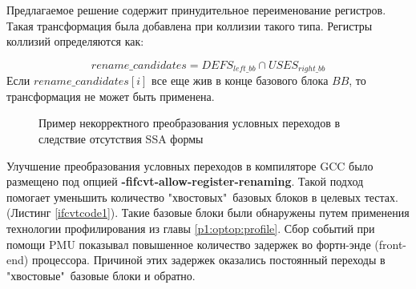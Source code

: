 Предлагаемое решение содержит принудительное переименование регистров. Такая трансформация была добавлена при коллизии такого типа. Регистры коллизий определяются как:

\begin{equation}
	rename\_candidates = DEFS_{left\_bb} \cap USES_{right\_bb} 
\end{equation}
Если $rename\_candidates[i]$ все еще жив в конце базового блока $BB$, то трансформация не может быть применена.


\begin{figure}[htbp]
	\centering

	
	\caption{Пример некорректного преобразования условных переходов в следствие отсутствия SSA формы}
	\label{fig:ifcvtsvg1}
\end{figure}

Улучшение преобразования условных переходов в компиляторе GCC было размещено под опцией \mbox{\textbf{-fifcvt-allow-register-renaming}}. Такой подход помогает уменьшить количество "хвостовых"\   базовых блоков в целевых тестах. (Листинг \ref{ifcvtcode1}). Такие базовые блоки были обнаружены путем применения технологии профилирования из главы \ref{p1:optop:profile}. Сбор событий при помощи PMU показывал повышенное количество задержек во фортн-энде (front-end) процессора. Причиной этих задержек оказались постоянный переходы в "хвостовые"\   базовые блоки и обратно.



